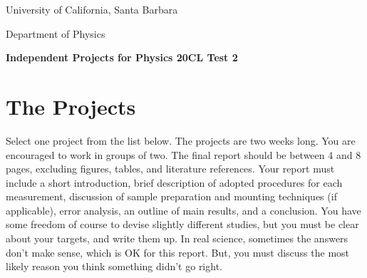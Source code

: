 \documentclass[12pt]{article}
\begin{document}

\hfil {\large University of California, Santa Barbara} \hfil

\vspace{0.1in}

\hfil {\large Department of Physics}\hfil

\normalfont

\begin{center}
    \LARGE \bfseries
    Independent Projects for Physics 20CL Test 2
\end{center}

\tableofcontents

\section{The Projects}

Select one project from the list below. The projects are two weeks long. You are encouraged to work in groups of two. The final report should be between 4 and 8 pages, excluding figures, tables, and literature references. Your report must include a short introduction, brief description of adopted procedures for each measurement, discussion of sample preparation and mounting techniques (if applicable), error analysis, an outline of main results, and a conclusion.  You have some freedom of course to devise slightly different studies, but you must be clear about your targets, and write them up.   In real science, sometimes the answers don't make sense, which is OK for this report.  But, you must discuss the most likely reason you think something didn't go right.
\end{document}
